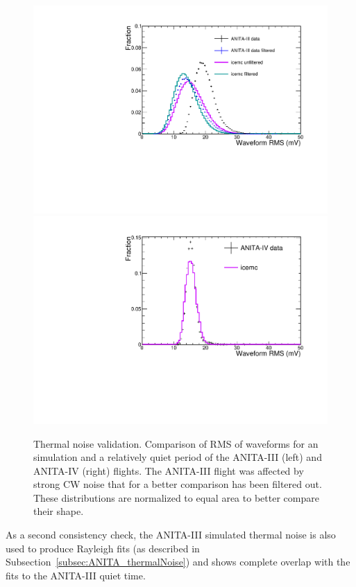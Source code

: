 \begin{figure}[!h]\centering
  \includegraphics[width=.45\linewidth]{./Figs/ValidationThermalNoiseA3_RMSwaveform.pdf}
  \includegraphics[width=.45\linewidth]{./Figs/ValidationThermalNoiseA4_RMSwaveform.pdf}

\caption{Thermal noise validation. Comparison of RMS of waveforms for an \icemc simulation and a relatively quiet period of the ANITA-III (left) and ANITA-IV (right) flights.
    The ANITA-III flight was affected by strong CW noise that for a better comparison has been filtered out.
    These distributions are normalized to equal area to better compare their shape.
  }
  \label{fig:RMSwaveform}
\end{figure}

As a second consistency check, the ANITA-III simulated thermal
noise is also used to produce Rayleigh fits (as described in
Subsection~\ref{subsec:ANITA_thermalNoise}) and shows complete overlap with the fits to the
ANITA-III quiet time.



